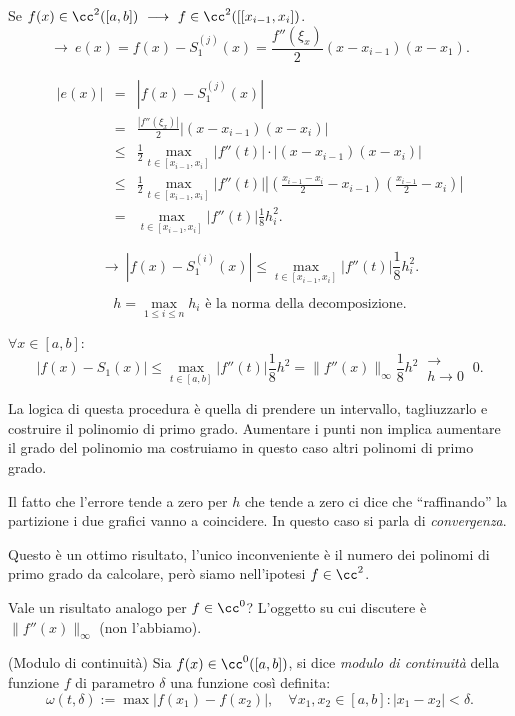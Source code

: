 Se $f(x) \in \cc^2([a,b]) \ \longrightarrow \ f \in \cc^2([[x_{i-1},x_i])$.
\[\longrightarrow \ e(x) = f(x) - S_1^{(j)}(x) = \frac{f''(\xi_x)}{2}
(x-x_{i-1})(x-x_1).\]

\[\begin{array}{lcl}
|e(x)| & = & |f(x) - S_1^{(j)}(x)| \\
& = & \frac{|f''(\xi_x)|}{2} |(x-x_{i-1})(x-x_i)| \\
& \leq & \frac{1}{2}\max_{t \in [x_{i-1},x_i]}|f''(t)| \cdot |(x-x_{i-1})(x-x_i)|\\
& \leq & \frac{1}{2}\max_{t \in [x_{i-1},x_i]}|f''(t)|
\left|\left(\frac{x_{i-1}-x_i}{2} -x_{i-1}\right) \left(
\frac{x_{i-1}}{2}-x_i\right)\right| \\
& = & \max_{t \in [x_{i-1},x_i]}|f''(t)|\frac{1}{8}h_i^2.
\end{array}
\]

\[
\longrightarrow \ \left| f(x) - S_1^{(i)}(x)\right| \leq \max_{t \in [x_{i-1},x_i]}
\left|f''(t)\right|\frac{1}{8}h_i^2.
\]

\[h = \max_{1 \leq i \leq n} h_i \textrm{ è la norma della decomposizione.}\]

$\forall x \in [a,b]$:
\[
|f(x) - S_1(x)| \leq \max_{t \in [a,b]}|f''(t)|\frac{1}{8}h^2 = \|f''(x) \|_\infty
\frac{1}{8}h^2\ \substack{\longrightarrow \\ h \to 0} \ 0.
\]

La logica di questa procedura è quella di prendere un intervallo,
tagliuzzarlo e costruire il polinomio di primo grado. Aumentare i punti
non implica aumentare il grado del polinomio ma costruiamo in questo caso
altri polinomi di primo grado.

Il fatto che l'errore tende a zero per $h$ che tende a zero ci dice che
``raffinando'' la partizione i due grafici vanno a coincidere. In questo caso
si parla di \emph{convergenza}.

Questo è un ottimo risultato, l'unico inconveniente è il numero dei polinomi
di primo grado da calcolare, però siamo nell'ipotesi $f \in \cc^2$.

Vale un risultato analogo per $f \in \cc^0$? L'oggetto su cui discutere è
$\|f''(x)\|_\infty$ (non l'abbiamo).

\begin{defi}(Modulo di continuità)
Sia $f(x) \in \cc^0([a,b])$, si dice \emph{modulo di continuità} della 
funzione $f$ di parametro $\delta$ una funzione così definita:
\[
\omega(t,\delta) := \max |f(x_1) - f(x_2)|, \quad \forall x_1, x_2 \in [a,b]
\colon |x_1-x_2| < \delta.
\]
\end{defi}

